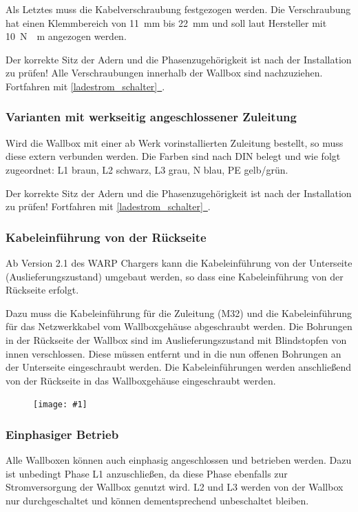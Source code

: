 \documentclass[a4paper,10pt]{article}
\newcommand{\gfx}[1]{\texttt{[image: \#1]}}
\newcommand*{\fullref}[1]{\hyperref[{#1}]{\ref*{#1}~\nameref*{#1}}}
\begin{document}
\begin{multicols*}{2}
	Als Letztes muss die Kabelverschraubung festgezogen werden. Die Verschraubung
	hat einen Klemmbereich von \SI{11}{\milli\meter} bis \SI{22}{\milli\meter} und soll laut Hersteller mit
	\SI{10}{\newton{}\meter} angezogen werden.

	Der korrekte Sitz der Adern und die Phasenzugehörigkeit ist nach der
	Installation zu prüfen! Alle Verschraubungen innerhalb der Wallbox sind
	nachzuziehen. Fortfahren mit \fullref{ladestrom_schalter}.

	\subsubsection{Varianten mit werkseitig angeschlossener Zuleitung}
	Wird die Wallbox mit einer ab Werk vorinstallierten Zuleitung bestellt, so
	muss diese extern verbunden werden. Die Farben sind nach DIN belegt und wie
	folgt zugeordnet: L1 braun, L2 schwarz, L3 grau, N blau, PE gelb/grün.

	Der korrekte Sitz der Adern und die Phasenzugehörigkeit ist nach der
	Installation zu prüfen! Fortfahren mit \fullref{ladestrom_schalter}.

	\subsubsection{Kabeleinführung von der Rückseite}
	Ab Version 2.1 des WARP Chargers kann die Kabel\-einführung von der Unterseite
	(Auslieferungszustand) umgebaut werden, so dass eine Kabeleinführung von der
	Rückseite erfolgt.

	Dazu muss die Kabeleinführung für die Zuleitung (M32) und die
	Kabeleinführung für das Netzwerkkabel vom Wallboxgehäuse abgeschraubt
	werden. Die Bohrungen in der Rückseite der Wallbox sind im
	Auslieferungszustand mit Blindstopfen von innen verschlossen.
	Diese müssen entfernt und in die nun offenen Bohrungen an der Unterseite
	eingeschraubt werden. Die Kabeleinführungen werden anschließend von
	der Rückseite in das Wallboxgehäuse eingeschraubt werden.

	\begin{figure}[H]
		\gfx{./img_warp2/resized/warp2_1_back_wp_ready_1000.jpg}
	\end{figure}

	\subsubsection{Einphasiger Betrieb}
	Alle Wallboxen können auch einphasig angeschlossen und betrieben werden.
	Dazu ist unbedingt Phase L1 anzuschließen, da diese Phase ebenfalls zur
	Stromversorgung der Wallbox genutzt wird. L2 und L3 werden von der Wallbox
	nur durchgeschaltet und können dementsprechend unbeschaltet bleiben.


\end{multicols*}
\end{document}
